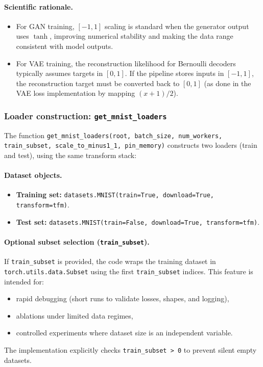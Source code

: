 \paragraph{Scientific rationale.}
\begin{itemize}
  \item For GAN training, $[-1,1]$ scaling is standard when the generator output uses $\tanh$, improving numerical stability and making the data range consistent with model outputs.
  \item For VAE training, the reconstruction likelihood for Bernoulli decoders typically assumes targets in $[0,1]$. If the pipeline stores inputs in $[-1,1]$, the reconstruction target must be converted back to $[0,1]$ (as done in the VAE loss implementation by mapping $(x+1)/2$).
\end{itemize}

\subsubsection{Loader construction: \texttt{get\_mnist\_loaders}}
\label{subsubsec:get_mnist_loaders}
The function
\texttt{get\_mnist\_loaders(root, batch\_size, num\_workers, train\_subset, scale\_to\_minus1\_1, pin\_memory)}
constructs two loaders (train and test), using the same transform stack:

\paragraph{Dataset objects.}
\begin{itemize}
  \item \textbf{Training set:} \texttt{datasets.MNIST(train=True, download=True, transform=tfm)}.
  \item \textbf{Test set:} \texttt{datasets.MNIST(train=False, download=True, transform=tfm)}.
\end{itemize}

\paragraph{Optional subset selection (\texttt{train\_subset}).}
If \texttt{train\_subset} is provided, the code wraps the training dataset in \texttt{torch.utils.data.Subset} using the first \texttt{train\_subset} indices. This feature is intended for:
\begin{itemize}
  \item rapid debugging (short runs to validate losses, shapes, and logging),
  \item ablations under limited data regimes,
  \item controlled experiments where dataset size is an independent variable.
\end{itemize}
The implementation explicitly checks \texttt{train\_subset > 0} to prevent silent empty datasets.

